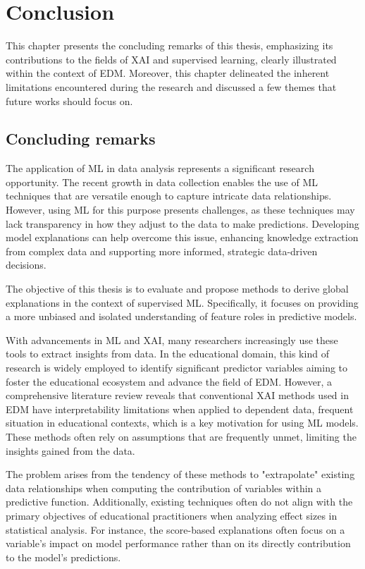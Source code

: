 \chapter{Conclusion}
\label{chap: conclusion}

This chapter presents the concluding remarks of this thesis, emphasizing its contributions to the fields of \gls{XAI} and supervised learning, clearly illustrated within the context of \gls{EDM}. Moreover, this chapter delineated the inherent limitations encountered during the research and discussed a few themes that future works should focus on.

\section{Concluding remarks}

The application of \gls{ML} in data analysis represents a significant research opportunity. The recent growth in data collection enables the use of \gls{ML} techniques that are versatile enough to capture intricate data relationships. However, using \gls{ML} for this purpose presents challenges, as these techniques may lack transparency in how they adjust to the data to make predictions. Developing model explanations can help overcome this issue, enhancing knowledge extraction from complex data and supporting more informed, strategic data-driven decisions.

The objective of this thesis is to evaluate and propose methods to derive global explanations in the context of supervised \gls{ML}. Specifically, it focuses on providing a more unbiased and isolated understanding of feature roles in predictive models. 

With advancements in \gls{ML} and \gls{XAI}, many researchers increasingly use these tools to extract insights from data. In the educational domain, this kind of research is widely employed to identify significant predictor variables aiming to foster the educational ecosystem and advance the field of \gls{EDM}. However, a comprehensive literature review reveals that conventional \gls{XAI} methods used in \gls{EDM} have interpretability limitations when applied to dependent data, frequent situation in educational contexts, which is a key motivation for using \gls{ML} models. These methods often rely on assumptions that are frequently unmet, limiting the insights gained from the data. 

The problem arises from the tendency of these methods to "extrapolate" existing data relationships when computing the contribution of variables within a predictive function. Additionally, existing techniques often do not align with the primary objectives of educational practitioners when analyzing effect sizes in statistical analysis. For instance, the score-based explanations often focus on a variable's impact on model performance rather than on its directly contribution to the model's predictions.

